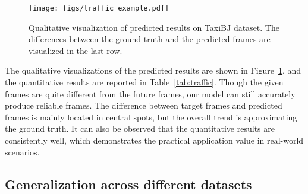\documentclass[10pt,twocolumn,letterpaper]{article}
\begin{document}
\begin{figure}[htbp]
\centering
\texttt{[image: figs/traffic\_example.pdf]} 
\caption{Qualitative visualization of predicted results on TaxiBJ dataset. The differences between the ground truth and the predicted frames are visualized in the last row.}
\label{fig:traffic_example} 
\end{figure}

The qualitative visualizations of the predicted results are shown in Figure~\ref{fig:traffic_example}, and the quantitative results are reported in Table~\ref{tab:traffic}. Though the given frames are quite different from the future frames, our model can still accurately produce reliable frames. The difference between target frames and predicted frames is mainly located in central spots, but the overall trend is approximating the ground truth. It can also be observed that the quantitative results are consistently well, which demonstrates the practical application value in real-world scenarios.

\begin{table}[h]
\centering
\caption{Quantitative results of different methods on the TaxiBJ dataset ( frames).}
\label{tab:traffic}
\end{table}

\subsection{Generalization across different datasets}
\label{lab:generalization}
\end{document}
